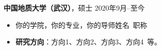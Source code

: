 \documentclass[11pt]{article}
\begin{document}
\begin{minipage}[t]{0.78\textwidth}
\begin{minipage}[t]{\textwidth}
        \vspace{0.5em}
        {\large \textbf{中国地质大学（武汉）}}，硕士 \hfill 2020年9月--至今
        \begin{itemize}
            \item 你的学院，你的专业，你的导师姓名\ 职称
            \item \textbf{研究方向}：方向1、方向2、方向3、方向4\ 等。
        \end{itemize}
        
        \vspace{1.2em}
        \end{minipage}
    \end{minipage}
    \hfill
    \begin{minipage}[t]{0.2\textwidth}
        \vspace{2em} %
        \setlength{\fboxsep}{0pt}
    \end{minipage}
\end{document}
